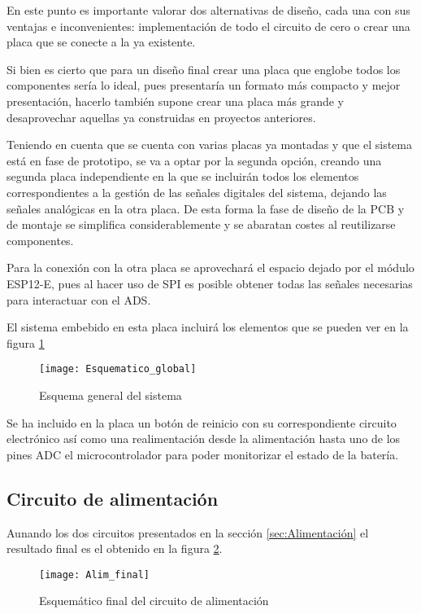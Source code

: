 En este punto es importante valorar dos alternativas de diseño, cada una con sus ventajas e inconvenientes: implementación de todo el circuito de cero o crear una placa que se conecte a la ya existente.

Si bien es cierto que para un diseño final crear una placa que englobe todos los componentes sería lo ideal, pues presentaría un formato más compacto y mejor presentación, hacerlo también supone crear una placa más grande y desaprovechar aquellas ya construidas en proyectos anteriores.

Teniendo en cuenta que se cuenta con varias placas ya montadas y que el sistema está en fase de prototipo, se va a optar por la segunda opción, creando una segunda placa independiente en la que se incluirán todos los elementos correspondientes a la gestión de las señales digitales del sistema, dejando las señales analógicas en la otra placa. De esta forma la fase de diseño de la \acrshort{PCB} y de montaje se simplifica considerablemente y se abaratan costes al reutilizarse componentes.

Para la conexión con la otra placa se aprovechará el espacio dejado por el módulo ESP12-E, pues al hacer uso de \acrshort{SPI} es posible obtener todas las señales necesarias para interactuar con el ADS.

El sistema embebido en esta placa incluirá los elementos que se pueden ver en la figura \ref{fig:Esquematico_global}

\begin{figure} [h]
    \centering
    \texttt{[image: Esquematico\_global]}
    \caption{Esquema general del sistema}
    \label{fig:Esquematico_global}
\end{figure}

Se ha incluido en la placa un botón de reinicio con su correspondiente circuito electrónico así como una realimentación desde la alimentación hasta uno de los pines \acrshort{ADC} el microcontrolador para poder monitorizar el estado de la batería.

\subsection{Circuito de alimentación\label{sec:Esquemáticos_alim}}

Aunando los dos circuitos presentados en la sección \ref{sec:Alimentación} el resultado final es el obtenido en la figura \ref{fig:Alim_final}.

\begin{figure} [h]
    \centering
    \texttt{[image: Alim\_final]}
    \caption{Esquemático final del circuito de alimentación}
    \label{fig:Alim_final}
\end{figure}

